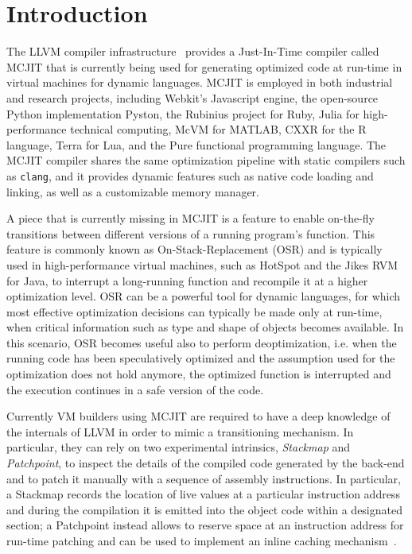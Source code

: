 
\section{Introduction}
\label{se:intro}

The LLVM compiler infrastructure~\cite{lattner2004llvm} provides a Just-In-Time compiler called MCJIT that is currently being used for generating optimized code at run-time in virtual machines for dynamic languages. MCJIT is employed in both industrial and research projects, including Webkit's Javascript engine, the open-source Python implementation Pyston, the Rubinius project for Ruby, Julia for high-performance technical computing, McVM for MATLAB, CXXR for the R language, Terra for Lua, and the Pure functional programming language. The MCJIT compiler shares the same optimization pipeline with static compilers such as {\tt clang}, and it provides dynamic features such as native code loading and linking, as well as a customizable memory manager.

A piece that is currently missing in MCJIT is a feature to enable on-the-fly transitions between different versions of a running program's function. This feature is commonly known as On-Stack-Replacement (OSR) and is typically used in high-performance virtual machines, such as HotSpot and the Jikes RVM for Java, to interrupt a long-running function and recompile it at a higher optimization level. OSR can be a powerful tool for dynamic languages, for which most effective optimization decisions can typically be made only at run-time, when critical information such as type and shape of objects becomes available. In this scenario, OSR becomes useful also to perform deoptimization, i.e. when the running code has been speculatively optimized and the assumption used for the optimization does not hold anymore, the optimized function is interrupted and the execution continues in a safe version of the code.

Currently VM builders using MCJIT are required to have a deep knowledge of the internals of LLVM in order to mimic a transitioning mechanism. In particular, they can rely on two experimental intrinsics, {\em Stackmap} and {\em Patchpoint}, to inspect the details of the compiled code generated by the back-end and to patch it manually with a sequence of assembly instructions. In particular, a Stackmap records the location of live values at a particular instruction address and during the compilation it is emitted into the object code within a designated section; a Patchpoint instead allows to reserve space at an instruction address for run-time patching and can be used to implement an inline caching mechanism~\cite{webkit14}.%

